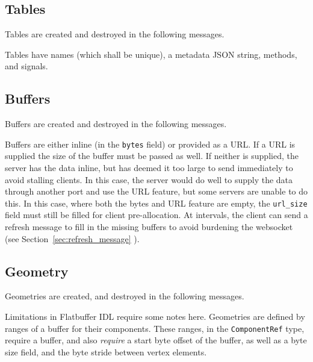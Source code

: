 \documentclass[11pt, oneside]{amsart}
\begin{document}
\subsection{Tables}

Tables are created and destroyed in the following messages.



Tables have names (which shall be unique), a metadata JSON string, methods, and signals.

\subsection{Buffers}

Buffers are created and destroyed in the following messages.



Buffers are either inline (in the \texttt{bytes} field) or provided as a URL. If a URL is supplied the size of the buffer must be passed as well. If neither is supplied, the server has the data inline, but has deemed it too large to send immediately to avoid stalling clients. In this case, the server would do well to supply the data through another port and use the URL feature, but some servers are unable to do this. In this case, where both the bytes and URL feature are empty, the \texttt{url\_size} field must still be filled for client pre-allocation. At intervals, the client can send a refresh message to fill in the missing buffers to avoid burdening the websocket (see Section~\ref{sec:refresh_message} ).

\subsection{Geometry}

Geometries are created, and destroyed in the following messages.



Limitations in Flatbuffer IDL require some notes here. Geometries are defined by ranges of a buffer for their components. These ranges, in the \texttt{ComponentRef} type, require a buffer, and also \textit{require} a start byte offset of the buffer, as well as a byte size field, and the byte stride between vertex elements.
\end{document}
